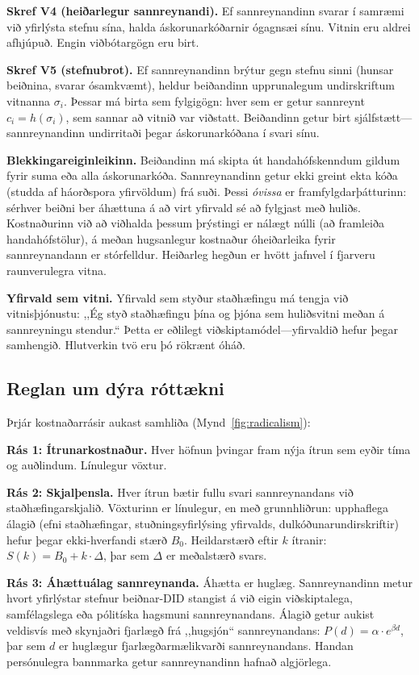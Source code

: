 \documentclass[11pt,a4paper,twocolumn]{article}
\begin{document}
\textbf{Skref V4 (heiðarlegur sannreynandi).} Ef sannreynandinn svarar í samræmi við yfirlýsta stefnu sína, halda áskorunarkóðarnir ógagnsæi sínu. Vitnin eru aldrei afhjúpuð. Engin viðbótargögn eru birt.

\textbf{Skref V5 (stefnubrot).} Ef sannreynandinn brýtur gegn stefnu sinni (hunsar beiðnina, svarar ósamkvæmt), heldur beiðandinn upprunalegum undirskriftum vitnanna $\sigma_i$. Þessar má birta sem fylgigögn: hver sem er getur sannreynt $c_i = h(\sigma_i)$, sem sannar að vitnið var viðstatt. Beiðandinn getur birt sjálfstætt---sannreynandinn undirritaði þegar áskorunarkóðana í svari sínu.

\textbf{Blekkingareiginleikinn.} Beiðandinn má skipta út handahófskenndum gildum fyrir suma eða alla áskorunarkóða. Sannreynandinn getur ekki greint ekta kóða (studda af háorðspora yfirvöldum) frá suði. Þessi \emph{óvissa} er framfylgdarþátturinn: sérhver beiðni ber áhættuna á að virt yfirvald sé að fylgjast með huliðs. Kostnaðurinn við að viðhalda þessum þrýstingi er nálægt núlli (að framleiða handahófstölur), á meðan hugsanlegur kostnaður óheiðarleika fyrir sannreynandann er stórfelldur. Heiðarleg hegðun er hvött jafnvel í fjarveru raunverulegra vitna.

\textbf{Yfirvald sem vitni.} Yfirvald sem styður staðhæfingu má tengja við vitnisþjónustu: ,,Ég styð staðhæfingu þína og þjóna sem huliðsvitni meðan á sannreyningu stendur.`` Þetta er eðlilegt viðskiptamódel---yfirvaldið hefur þegar samhengið. Hlutverkin tvö eru þó rökrænt óháð.

\subsection{Reglan um dýra róttækni}

Þrjár kostnaðarrásir aukast samhliða (Mynd~\ref{fig:radicalism}):

\textbf{Rás 1: Ítrunarkostnaður.} Hver höfnun þvingar fram nýja ítrun sem eyðir tíma og auðlindum. Línulegur vöxtur.

\textbf{Rás 2: Skjalþensla.} Hver ítrun bætir fullu svari sannreynandans við staðhæfingarskjalið. Vöxturinn er línulegur, en með grunnhliðrun: upphaflega álagið (efni staðhæfingar, stuðningsyfirlýsing yfirvalds, dulkóðunarundirskriftir) hefur þegar ekki-hverfandi stærð $B_0$. Heildarstærð eftir $k$ ítranir: $S(k) = B_0 + k \cdot \Delta$, þar sem $\Delta$ er meðalstærð svars.

\textbf{Rás 3: Áhættuálag sannreynanda.} Áhætta er huglæg. Sannreynandinn metur hvort yfirlýstar stefnur beiðnar-DID stangist á við eigin viðskiptalega, samfélagslega eða pólitíska hagsmuni sannreynandans. Álagið getur aukist veldisvís með skynjaðri fjarlægð frá ,,hugsjón`` sannreynandans: $P(d) = \alpha \cdot e^{\beta d}$, þar sem $d$ er huglægur fjarlægðarmælikvarði sannreynandans. Handan persónulegra bannmarka getur sannreynandinn hafnað algjörlega.
\end{document}
